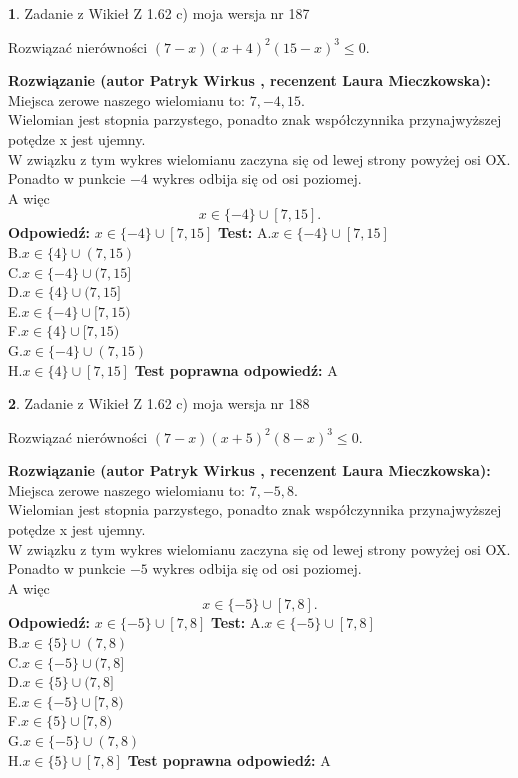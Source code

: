 \documentclass[12pt, a4paper]{article}
\theoremstyle{definition} %
\newtheorem{zad}{}
\newcommand{\zadStart}[1]{\begin{zad}#1\newline}
\newcommand{\zadStop}{\end{zad}}
\newcommand{\rozwStart}[2]{\noindent \textbf{Rozwiązanie (autor #1 , recenzent #2): }\newline}
\newcommand{\rozwStop}{\newline}
\newcommand{\odpStart}{\noindent \textbf{Odpowiedź:}\newline}
\newcommand{\odpStop}{\newline}
\newcommand{\testStart}{\noindent \textbf{Test:}\newline}
\newcommand{\testStop}{\newline}
\newcommand{\kluczStart}{\noindent \textbf{Test poprawna odpowiedź:}\newline}
\newcommand{\kluczStop}{\newline}
\begin{document}
\zadStart{Zadanie z Wikieł Z 1.62 c) moja wersja nr 187}

Rozwiązać nierówności $(7-x)(x+4)^{2}(15-x)^{3}\le0$.
\zadStop
\rozwStart{Patryk Wirkus}{Laura Mieczkowska}
Miejsca zerowe naszego wielomianu to: $7, -4, 15$.\\
Wielomian jest stopnia parzystego, ponadto znak współczynnika przy\linebreak najwyższej potędze x jest ujemny.\\ W związku z tym wykres wielomianu zaczyna się od lewej strony powyżej osi OX.\\
Ponadto w punkcie $-4$ wykres odbija się od osi poziomej.\\
A więc $$x \in \{-4\} \cup [7,15].$$
\rozwStop
\odpStart
$x \in \{-4\} \cup [7,15]$
\odpStop
\testStart
A.$x \in \{-4\} \cup [7,15]$\\
B.$x \in \{4\} \cup (7,15)$\\
C.$x \in \{-4\} \cup (7,15]$\\
D.$x \in \{4\} \cup (7,15]$\\
E.$x \in \{-4\} \cup [7,15)$\\
F.$x \in \{4\} \cup [7,15)$\\
G.$x \in \{-4\} \cup (7,15)$\\
H.$x \in \{4\} \cup [7,15]$
\testStop
\kluczStart
A
\kluczStop



\zadStart{Zadanie z Wikieł Z 1.62 c) moja wersja nr 188}

Rozwiązać nierówności $(7-x)(x+5)^{2}(8-x)^{3}\le0$.
\zadStop
\rozwStart{Patryk Wirkus}{Laura Mieczkowska}
Miejsca zerowe naszego wielomianu to: $7, -5, 8$.\\
Wielomian jest stopnia parzystego, ponadto znak współczynnika przy\linebreak najwyższej potędze x jest ujemny.\\ W związku z tym wykres wielomianu zaczyna się od lewej strony powyżej osi OX.\\
Ponadto w punkcie $-5$ wykres odbija się od osi poziomej.\\
A więc $$x \in \{-5\} \cup [7,8].$$
\rozwStop
\odpStart
$x \in \{-5\} \cup [7,8]$
\odpStop
\testStart
A.$x \in \{-5\} \cup [7,8]$\\
B.$x \in \{5\} \cup (7,8)$\\
C.$x \in \{-5\} \cup (7,8]$\\
D.$x \in \{5\} \cup (7,8]$\\
E.$x \in \{-5\} \cup [7,8)$\\
F.$x \in \{5\} \cup [7,8)$\\
G.$x \in \{-5\} \cup (7,8)$\\
H.$x \in \{5\} \cup [7,8]$
\testStop
\kluczStart
A
\kluczStop
\end{document}
